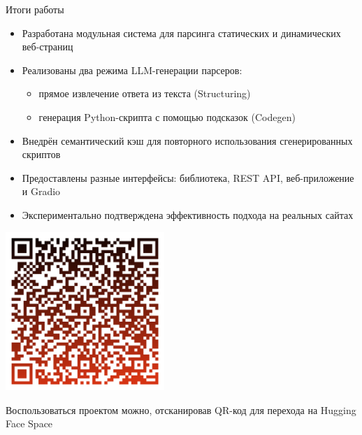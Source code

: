 \documentclass
  [ russian
  , aspectratio=1610 %
  ] {beamer}
\begin{document}
\begin{frame}{Итоги работы}
    \begin{itemize}
        \item Разработана модульная система для парсинга статических и динамических веб-страниц
        \item Реализованы два режима LLM-генерации парсеров:
            \begin{itemize}
                \item прямое извлечение ответа из текста (Structuring)
                \item генерация Python-скрипта с помощью подсказок (Codegen)
            \end{itemize}
        \item Внедрён семантический кэш для повторного использования сгенерированных скриптов
        \item Предоставлены разные интерфейсы: библиотека, REST API, веб-приложение и Gradio
        \item Экспериментально подтверждена эффективность подхода на реальных сайтах
    \end{itemize}
\end{frame}


\begin{frame}
    \begin{center}
        \includegraphics[width=6cm]{figures/qr.png}
        \vspace{1em}

        \scriptsize{Воспользоваться проектом можно, отсканировав QR-код для перехода на Hugging Face Space}
    \end{center}
\end{frame}
\end{document}
